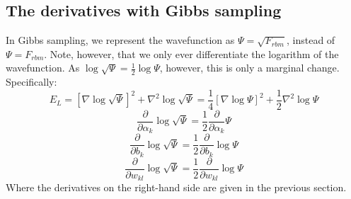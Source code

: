 \documentclass[a4paper, 10pt]{article}
\begin{document}
\begin{appendices}
	\subsection{The derivatives with Gibbs sampling}
	In Gibbs sampling, we represent the wavefunction as $\Psi=\sqrt{F_{rbm}}$, instead of $\Psi=F_{rbm}$. Note, however, that we only ever differentiate the logarithm of the wavefunction. As $\log \sqrt{\Psi}=\frac{1}{2}\log \Psi$, however, this is only a marginal change. Specifically:
	\begin{equation}
	E_L=[\nabla \log \sqrt{\Psi}]^2 + \nabla^2 \log \sqrt{\Psi} =\frac{1}{4}[\nabla \log \Psi]^2 +\frac{1}{2}\nabla^2 \log \Psi
	\end{equation}
	\begin{equation}
	\frac{\partial }{\partial \alpha_k}\log \sqrt{\Psi}=\frac{1}{2}\frac{\partial }{\partial \alpha_k}\Psi
	\end{equation}
	\begin{equation}
	\frac{\partial }{\partial b_k}\log \sqrt{\Psi}=\frac{1}{2}\frac{\partial }{\partial b_k}\log \Psi 
	\end{equation}
	\begin{equation}
	\frac{\partial}{\partial w_{kl}}\log \sqrt{\Psi}=\frac{1}{2}\frac{\partial}{\partial w_{kl}}\log \Psi
	\end{equation}
	Where the derivatives on the right-hand side are given in the previous section.
	\end{appendices}
\end{document}
